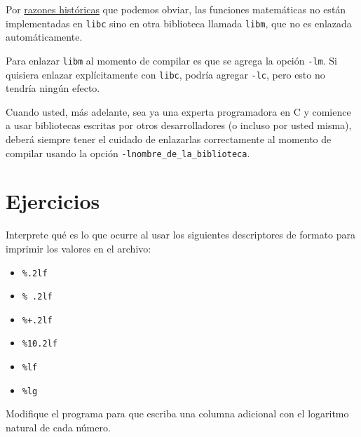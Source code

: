 Por
\href{http://stackoverflow.com/questions/1033898/why-do-you-have-to-link-the-math-library-in-c}{razones
históricas} que podemos obviar, las funciones matemáticas no están
implementadas en \lstinline!libc! sino en otra biblioteca llamada
\lstinline!libm!, que no es enlazada automáticamente.

Para enlazar \lstinline!libm! al momento de compilar es que se agrega la
opción \lstinline!-lm!. Si quisiera enlazar explícitamente con
\lstinline!libc!, podría agregar \lstinline!-lc!, pero esto no tendría
ningún efecto.

Cuando usted, más adelante, sea ya una experta programadora en C y
comience a usar bibliotecas escritas por otros desarrolladores (o
incluso por usted misma), deberá siempre tener el cuidado de enlazarlas
correctamente al momento de compilar usando la opción
\lstinline!-lnombre_de_la_biblioteca!.

\section{Ejercicios}

Interprete qué es lo que ocurre al usar los siguientes descriptores de
formato para imprimir los valores en el archivo:

\begin{itemize}
\item
  \lstinline!%.2lf!
\item
  \lstinline!% .2lf!
\item
  \lstinline!%+.2lf!
\item
  \lstinline!%10.2lf!
\item
  \lstinline!%lf!
\item
  \lstinline!%lg!
\end{itemize}

Modifique el programa para que escriba una columna adicional con el
logaritmo natural de cada número.
